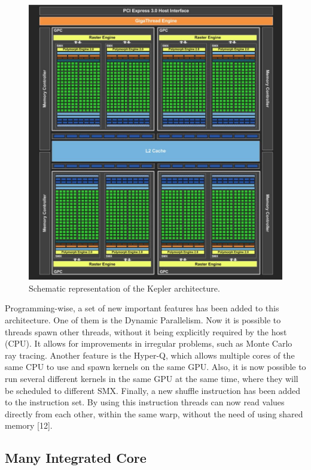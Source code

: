 \begin{figure}[!htp]
	\begin{center}
		\includegraphics[scale=0.4]{../../common/img/kepler_arch.jpg}
		\caption{Schematic representation of the \nvidia Kepler architecture.}
		\label{fig:kepler}
	\end{center}
\end{figure}

Programming-wise, a set of new important features has been added to this architecture. One of them is the Dynamic Parallelism. Now it is possible to \cuda threads spawn other threads, without it being explicitly required by the host (CPU). It allows for improvements in irregular problems, such as Monte Carlo ray tracing. Another feature is the Hyper-Q, which allows multiple cores of the same CPU to use and spawn kernels on the same GPU. Also, it is now possible to run several different kernels in the same GPU at the same time, where they will be scheduled to different SMX. Finally, a new shuffle instruction has been added to the instruction set. By using this instruction \cuda threads can now read values directly from each other, within the same warp, without the need of using shared memory [12].

\subsection{\intel Many Integrated Core}

